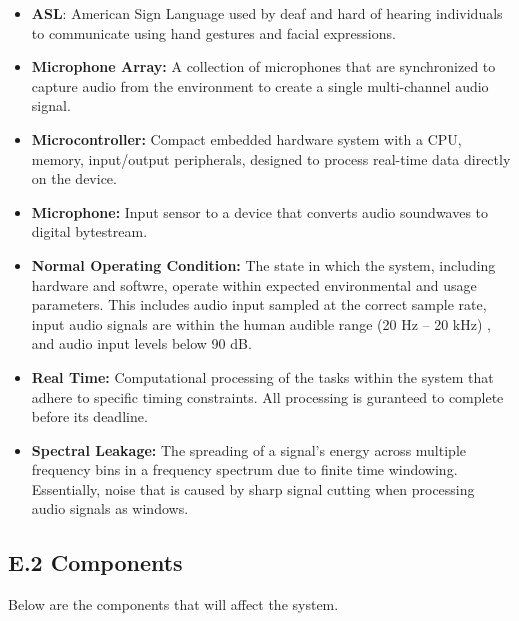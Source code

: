 \documentclass[12pt]{article}
\theoremstyle{definition}
\begin{document}
\begin{itemize}

  \item \textbf{ASL}: American Sign Language used by deaf and hard of hearing
  individuals to communicate using hand gestures and facial expressions.

  \item \textbf{Microphone Array:}\label{def:microphone_array} A collection of
  microphones that are synchronized to capture audio from the environment to
  create a single multi-channel audio signal.

  \item \textbf{Microcontroller:}\label{def:microcontroller} Compact embedded
  hardware system with a CPU, memory, input/output peripherals, designed to
  process real-time data directly on the device.

  \item \textbf{Microphone:}\label{def:microphone} Input sensor to a device that
  converts audio soundwaves to digital bytestream.

  \item \textbf{Normal Operating Condition:}
  \label{def:normal_operation_condition} The state in which the system,
  including hardware and softwre, operate within expected environmental and
  usage parameters. This includes audio input sampled at the correct sample
  rate, input audio signals are within the human audible range (20 Hz – 20 kHz)
  \cite{Neuroscience2001}, and audio input levels below 90 dB.

  \item \textbf{Real Time:} \label{def:real_time} Computational processing of
  the tasks within the system that adhere to specific timing constraints.
  All processing is guranteed to complete before its deadline.

  \item \textbf{Spectral Leakage:} \label{def:spectral_leakage} The spreading of
  a signal's energy across multiple frequency bins in a frequency spectrum due
  to finite time windowing. Essentially, noise that is caused by sharp signal
  cutting when processing audio signals as windows.

\end{itemize}

\subsection{E.2 Components}

Below are the components that will affect the system.
\end{document}
